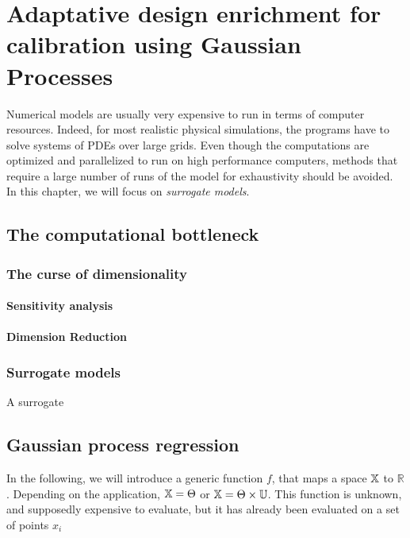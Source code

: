 \documentclass[../../Main_ManuscritThese.tex]{subfiles}
\begin{document}
\chapter{Adaptative design enrichment for calibration using Gaussian Processes}
\label{chap:adaptative_design_gp}
\minitoc
\newpage
\subfileLocal{\pagestyle{contentStyle}}



Numerical models are usually very expensive to run in terms of computer resources. Indeed, for most realistic physical simulations, the programs have to solve systems of PDEs over large grids. Even though the computations are optimized and parallelized to run on high performance computers, methods that require a large number of runs of the model for exhaustivity should be avoided. In this chapter, we will focus on \emph{surrogate models}.

\section{The computational bottleneck}

\subsection{The curse of dimensionality}

\subsubsection{Sensitivity analysis}

\subsubsection{Dimension Reduction}

\subsection{Surrogate models}
\begin{definition}
  A surrogate
\end{definition}


\section{Gaussian process regression}
In the following, we will introduce a generic function $f$, that maps a space $\mathbb{X}$ to $\mathbb{R}$. Depending on the application, $\mathbb{X} = \Theta$ or $\mathbb{X} = \Theta \times \mathbb{U}$. This function is unknown, and supposedly expensive to evaluate, but it has already been evaluated on a set of points $x_i$
\cite{rasmussen_gaussian_2006}
\end{document}
